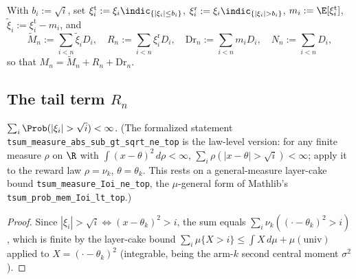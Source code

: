 \begin{definition}\label{def:lil_trunc}
With $b_i:=\sqrt i$, set
$\xi_i^{\mathrm t}:=\xi_i\indic_{\{|\xi_i|\le b_i\}}$,
$\xi_i^{\mathrm r}:=\xi_i\indic_{\{|\xi_i|> b_i\}}$,
$m_i:=\E[\xi_i^{\mathrm t}]$, $\tilde\xi_i:=\xi_i^{\mathrm t}-m_i$, and
\[
  \tilde M_n:=\sum_{i<n}\tilde\xi_i D_i,\quad
  R_n:=\sum_{i<n}\xi_i^{\mathrm r} D_i,\quad
  \mathrm{Dr}_n:=\sum_{i<n} m_i D_i,\quad
  N_n:=\sum_{i<n} D_i,
\]
so that $M_n=\tilde M_n+R_n+\mathrm{Dr}_n$.
\end{definition}

\subsection{The tail term $R_n$}

\begin{lemma}\label{lem:trunc_tail_summable}
\leanok
{}
$\sum_{i}\Prob(|\xi_i|>\sqrt i)<\infty$. (The formalized statement
\texttt{tsum\_measure\_abs\_sub\_gt\_sqrt\_ne\_top} is the law-level version: for any finite measure
$\rho$ on $\R$ with $\int(x-\theta)^2\,d\rho<\infty$, $\sum_i\rho(|x-\theta|>\sqrt i)<\infty$; apply
it to the reward law $\rho=\nu_k$, $\theta=\theta_k$. This rests on a general-measure layer-cake
bound \texttt{tsum\_measure\_Ioi\_ne\_top}, the $\mu$-general form of Mathlib's
\texttt{tsum\_prob\_mem\_Ioi\_lt\_top}.)
\end{lemma}
\begin{proof}\leanok
Since $|\xi_i|>\sqrt i \iff (x-\theta_k)^2>i$, the sum equals $\sum_i\nu_k((\cdot-\theta_k)^2>i)$,
which is finite by the layer-cake bound $\sum_i\mu\{X>i\}\le\int X\,d\mu+\mu(\text{univ})$ applied to
$X=(\cdot-\theta_k)^2$ (integrable, being the arm-$k$ second central moment $\sigma^2$).
\end{proof}

